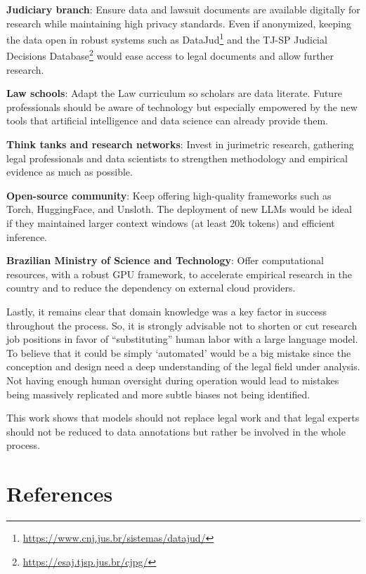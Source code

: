 \documentclass[
  12pt,
]{article}
\begin{document}
\textbf{Judiciary branch}: Ensure data and lawsuit documents are
available digitally for research while maintaining high privacy
standards. Even if anonymized, keeping the data open in robust systems
such as DataJud\footnote{\url{https://www.cnj.jus.br/sistemas/datajud/}}
and the TJ-SP Judicial Decisions Database\footnote{\url{https://esaj.tjsp.jus.br/cjpg/}}
would ease access to legal documents and allow further research.

\textbf{Law schools}: Adapt the Law curriculum so scholars are data
literate. Future professionals should be aware of technology but
especially empowered by the new tools that artificial intelligence and
data science can already provide them.

\textbf{Think tanks and research networks}: Invest in jurimetric
research, gathering legal professionals and data scientists to
strengthen methodology and empirical evidence as much as possible.

\textbf{Open-source community}: Keep offering high-quality frameworks
such as Torch, HuggingFace, and Unsloth. The deployment of new LLMs
would be ideal if they maintained larger context windows (at least 20k
tokens) and efficient inference.

\textbf{Brazilian Ministry of Science and Technology}: Offer
computational resources, with a robust GPU framework, to accelerate
empirical research in the country and to reduce the dependency on
external cloud providers.

Lastly, it remains clear that domain knowledge was a key factor in
success throughout the process. So, it is strongly advisable not to
shorten or cut research job positions in favor of ``substituting'' human
labor with a large language model. To believe that it could be simply
`automated' would be a big mistake since the conception and design need
a deep understanding of the legal field under analysis. Not having
enough human oversight during operation would lead to mistakes being
massively replicated and more subtle biases not being identified.

This work shows that models should not replace legal work and that legal
experts should not be reduced to data annotations but rather be involved
in the whole process.

\newpage{}

\section{References}\label{sec-references}
\end{document}
